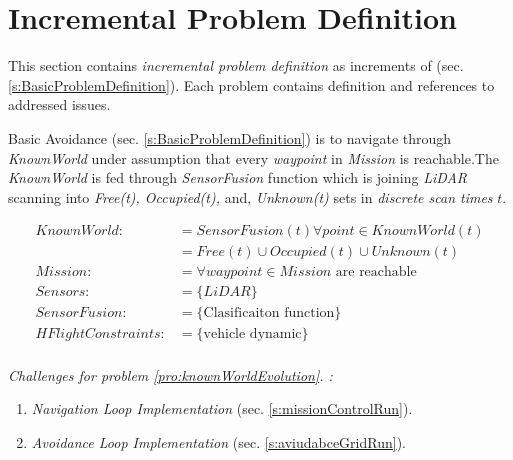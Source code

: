 \section{Incremental Problem Definition}\label{s:IncrementalProblemDefinition}

\noindent This section contains \emph{incremental problem definition} as increments of (sec. \ref{s:BasicProblemDefinition}). Each problem contains definition and references to addressed issues.

\begin{problem}{Basic Avoidance}\label{pro:knownWorldEvolution} (sec. \ref{s:BasicProblemDefinition}) is to navigate through \emph{KnownWorld} under assumption that every \emph{waypoint} in \emph{Mission} is reachable.The \emph{KnownWorld} is fed through \emph{SensorFusion} function which is joining \emph{LiDAR} scanning into \emph{Free(t), Occupied(t),} and, \emph{Unknown(t)} sets in \emph{discrete scan times} $t$. 

    \begin{equation}\label{eq:basicProblemDefinition}
        \begin{aligned}
            KnownWorld:&= SensorFusion(t)\forall point\in KnownWorld(t)\\
                       &=Free(t) \cup Occupied(t) \cup Unknown(t)\\
            Mission:&= \forall waypoint\in Mission \text{ are reachable}\\
            Sensors:&= \{LiDAR\}\\
            SensorFusion:&= \{\text{Clasificaiton function}\}\\
            HFlightConstraints:&=\{\text{vehicle dynamic}\}\\
        \end{aligned}
    \end{equation}
    
    
    \noindent \emph{Challenges for problem  \ref{pro:knownWorldEvolution}. :}
    \begin{enumerate}
        \item \emph{Navigation Loop Implementation} (sec. \ref{s:missionControlRun}).
        
        \item \emph{Avoidance Loop Implementation}  (sec. \ref{s:aviudabceGridRun}).
    \end{enumerate}   
\end{problem}


